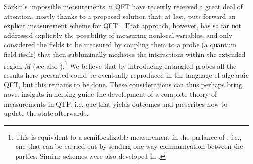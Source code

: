 \documentclass[12pt]{article}
\begin{document}
Sorkin's impossible measurements in QFT have recently received a great deal of attention, mostly thanks to a proposed solution that, at last, puts forward an explicit measurement scheme for QFT \cite{fewster2020quantum, fewster2020generally, bostelmann2021impossible, fewster2023measurement}. %
That approach, however,  has so far not addressed explicitly the possibility of measuring nonlocal variables, and only considered the fields to be measured by coupling them to a probe (a quantum field itself) that then subluminally mediates the interactions within the extended region \textit{M} (see also \cite{van2021relativistic}).\footnote{This is equivalent to a semilocalizable measurement in the parlance of \cite{beckman2001causal, eggeling2002semicausal}, i.e., one that can be carried out by sending one-way communication between the parties. Similar schemes were also developed in \cite{groisman2001nonlocal}.} We believe that by introducing entangled probes all the results here presented could be eventually reproduced in the language of algebraic QFT, but this remains to be done. %
These considerations can thus perhaps bring novel insights in helping guide the development of a complete theory of measurements in QTF, i.e. one that yields outcomes and prescribes how to update the state afterwards.
\end{document}
